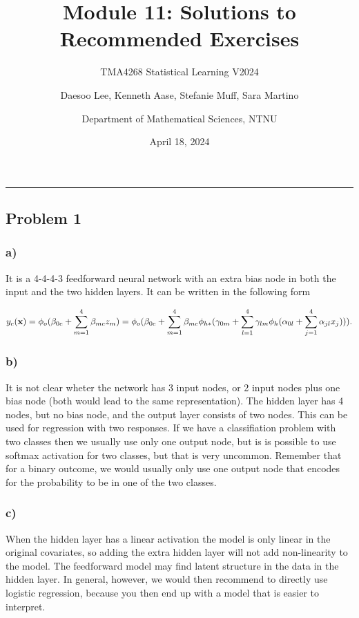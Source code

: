 \documentclass[
]{article}
\title{Module 11: Solutions to Recommended Exercises}
\subtitle{TMA4268 Statistical Learning V2024}
\author{Daesoo Lee, Kenneth Aase, Stefanie Muff, Sara
Martino \and Department of Mathematical Sciences, NTNU}
\date{April 18, 2024}
\begin{document}
\maketitle

\begin{center}\rule{0.5\linewidth}{0.5pt}\end{center}

\hypertarget{problem-1}{%
\subsection{Problem 1}\label{problem-1}}

\hypertarget{a}{%
\subsubsection{a)}\label{a}}

It is a 4-4-4-3 feedforward neural network with an extra bias node in
both the input and the two hidden layers. It can be written in the
following form

\[
y_c({\bf x})=\phi_o(\beta_{0c}+\sum_{m=1}^4 \beta_{mc}z_{m})=\phi_o(\beta_{0c}+\sum_{m=1}^4 \beta_{mc}\phi_{h*}(\gamma_{0m}+\sum_{l=1}^4 \gamma_{lm}\phi_h(\alpha_{0l}+\sum_{j=1}^4 \alpha_{jl}x_{j}))).
\]

\hypertarget{b}{%
\subsubsection{b)}\label{b}}

It is not clear wheter the network has 3 input nodes, or 2 input nodes
plus one bias node (both would lead to the same representation). The
hidden layer has 4 nodes, but no bias node, and the output layer
consists of two nodes. This can be used for regression with two
responses. If we have a classifiation problem with two classes then we
usually use only one output node, but is is possible to use softmax
activation for two classes, but that is very uncommon. Remember that for
a binary outcome, we would usually only use one output node that encodes
for the probability to be in one of the two classes.

\hypertarget{c}{%
\subsubsection{c)}\label{c}}

When the hidden layer has a linear activation the model is only linear
in the original covariates, so adding the extra hidden layer will not
add non-linearity to the model. The feedforward model may find latent
structure in the data in the hidden layer. In general, however, we would
then recommend to directly use logistic regression, because you then end
up with a model that is easier to interpret.
\end{document}
